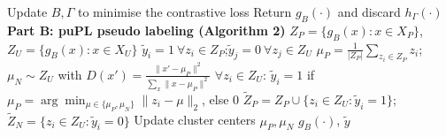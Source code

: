 \documentclass{article}
\begin{document}
\begin{algorithm}[!h]
\begin{algorithmic}[1]
	    \STATE Update $B,\Gamma$ to minimise the contrastive loss
	    \ENDFOR
	    \STATE Return $g_{B}(\cdot)$ and discard $h_{\Gamma}(\cdot)$
	    \STATE \textbf{Part B: puPL pseudo labeling (Algorithm 2)}
	    \STATE $Z_{P}=\{g_{B}(x):x\in X_{P}\}$,\quad $Z_{U}=\{g_{B}(x):x\in X_{U}\}$
	    \STATE $\tilde{y}_{i}=1\ \forall z_{i}\in Z_{P}$;\quad $\tilde{y}_{j}=0\ \forall z_{j}\in Z_{U}$
	    \STATE $\mu_{P}=\frac{1}{|Z_{P}|}\sum_{z_{i}\in Z_{P}}z_{i}$;\quad
	    $\mu_{N}\sim Z_{U}$ with $D(x')=\frac{\|x'-\mu_{P}\|^{2}}{\sum_{x}\|x-\mu_{P}\|^{2}}$ %
	    \STATE $\forall z_{i}\in Z_{U}$: $\tilde{y}_{i}=1$ if $\mu_{P}=\arg\min_{\mu\in\{\mu_{P},\mu_{N}\}}\|z_{i}-\mu\|_{2}$, else $0$
	    \STATE $\tilde{Z}_{P}=Z_{P}\cup\{z_{i}\in Z_{U}:\tilde{y}_{i}=1\}$;\quad
	    $\tilde{Z}_{N}=\{z_{i}\in Z_{U}:\tilde{y}_{i}=0\}$
	    \STATE Update cluster centers $\mu_{P},\mu_{N}$ %
	    \ENDWHILE
		\RETURN $g_{B}(\cdot)$, $\tilde{y}$
	\end{algorithmic}
\end{algorithm}
\end{document}
